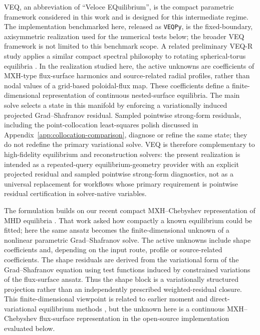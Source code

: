 \documentclass[final, 3p, times]{elsarticle}
\begin{document}
VEQ, an abbreviation of ``Veloce EQuilibrium'', is the compact parametric framework considered in this work and is designed for this intermediate regime. The implementation benchmarked here, released as \texttt{VEQPy}, is the fixed-boundary, axisymmetric realization used for the numerical tests below; the broader VEQ framework is not limited to this benchmark scope. A related preliminary VEQ-R study applies a similar compact spectral philosophy to rotating spherical-torus equilibria \cite{Li2026VEQR}. In the realization studied here, the active unknowns are coefficients of MXH-type flux-surface harmonics and source-related radial profiles, rather than nodal values of a grid-based poloidal-flux map. These coefficients define a finite-dimensional representation of continuous nested-surface equilibria. The main solve selects a state in this manifold by enforcing a variationally induced projected Grad--Shafranov residual. Sampled pointwise strong-form residuals, including the point-collocation least-squares polish discussed in Appendix~\ref{app:collocation-comparison}, diagnose or refine the same state; they do not redefine the primary variational solve. VEQ is therefore complementary to high-fidelity equilibrium and reconstruction solvers: the present realization is intended as a repeated-query equilibrium-geometry provider with an explicit projected residual and sampled pointwise strong-form diagnostics, not as a universal replacement for workflows whose primary requirement is pointwise residual certification in solver-native variables.

The formulation builds on our recent compact MXH--Chebyshev representation of MHD equilibria \cite{Xie2026arxiv}. That work asked how compactly a known equilibrium could be fitted; here the same ansatz becomes the finite-dimensional unknown of a nonlinear parametric Grad--Shafranov solve. The active unknowns include shape coefficients and, depending on the input route, profile or source-related coefficients. The shape residuals are derived from the variational form of the Grad--Shafranov equation using test functions induced by constrained variations of the flux-surface ansatz. Thus the shape block is a variationally structured projection rather than an independently prescribed weighted-residual closure. This finite-dimensional viewpoint is related to earlier moment and direct-variational equilibrium methods \cite{Lao1981,Lao1982,Lao1984,Haney1995,Ludwig1995}, but the unknown here is a continuous MXH--Chebyshev flux-surface representation in the open-source implementation evaluated below.
\end{document}
